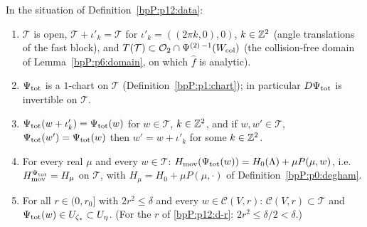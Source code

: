 \begin{proposition}\label{bpP:p12:chart}
In the situation of Definition~\ref{bpP:p12:data}:
\begin{enumerate}[label=(\alph*)]
\item $\mathcal T$ is open, $\mathcal T+\iota'_k=\mathcal T$ for $\iota'_k=((2\pi k,0),0)$, $k\in\mathbb{Z}^2$ (angle translations of the fast block), and $T(\mathcal T)\subset\mathcal O_2\cap\Psi^{(2)\,-1}(W_{\rm col})$ (the collision-free domain of Lemma~\ref{bpP:p6:domain}, on which $\hat f$ is analytic).
\item $\Psi_{\rm tot}$ is a $1$-chart on $\mathcal T$ (Definition~\ref{bpP:p1:chart}); in particular $D\Psi_{\rm tot}$ is invertible on $\mathcal T$.
\item $\Psi_{\rm tot}(w+\iota'_k)=\Psi_{\rm tot}(w)$ for $w\in\mathcal T$, $k\in\mathbb{Z}^2$, and if $w,w'\in\mathcal T$, $\Psi_{\rm tot}(w')=\Psi_{\rm tot}(w)$ then $w'=w+\iota'_k$ for some $k\in\mathbb{Z}^2$.
\item For every real $\mu$ and every $w\in\mathcal T$: $H_{\rm mov}(\Psi_{\rm tot}(w))=H_0(\Lambda)+\mu P(\mu,w)$, i.e.\ $H_{\rm mov}^{\Psi_{\rm tot}}=H_\mu$ on $\mathcal T$, with $H_\mu=H_0+\mu P(\mu,\cdot)$ of Definition~\ref{bpP:p0:degham}.
\item For all $r\in(0,r_0]$ with $2r^2\le\delta$ and every $w\in\mathcal C(V,r)$: $\mathcal C(V,r)\subset\mathcal T$ and $\Psi_{\rm tot}(w)\in U_{\zeta_*}\subset U_\eta$. (For the $r$ of \ref{bpP:p12:d-r}: $2r^2\le\delta/2<\delta$.)
\end{enumerate}
\end{proposition}

